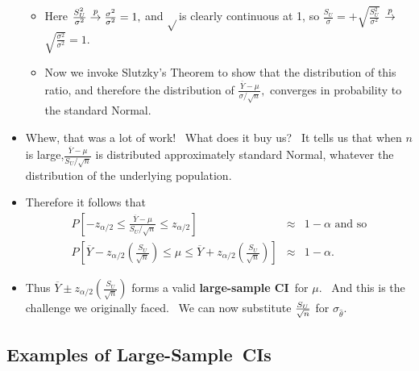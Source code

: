 \documentclass[11pt]{article}
\begin{document}
\begin{itemize}
\begin{itemize}
\item Here $\frac{S_{U}^{2}}{\sigma ^{2}}\overset{p}{\rightarrow }\frac{%
\sigma ^{2}}{\sigma ^{2}}=1,$ and $\sqrt{}$is clearly continuous at 1, so $%
\frac{S_{U}}{\sigma }=+\sqrt{\frac{S_{U}^{2}}{\sigma ^{2}}}$ $\overset{p}{%
\rightarrow }$ $\sqrt{\frac{\sigma ^{2}}{\sigma ^{2}}}=1.$

\item Now we invoke Slutzky's Theorem to show that the distribution of this
ratio, and therefore the distribution of $\frac{\overline{Y}-\mu }{\sigma /%
\sqrt{n}},$ converges in probability to the standard Normal.
\end{itemize}

\item Whew, that was a lot of work! \ What does it buy us? \ It tells us
that when $n$ is large,$\frac{\overline{Y}-\mu }{S_{U}^{{}}/\sqrt{n}}$ is
distributed approximately standard Normal, whatever the distribution of the
underlying population. \ 

\item Therefore it follows that%
\begin{eqnarray*}
P\left[ -z_{\alpha /2}\leq \frac{\overline{Y}-\mu }{S_{U}/\sqrt{n}}\leq
z_{\alpha /2}\right] &\approx &1-\alpha \text{ and so} \\
P\left[ \overline{Y}-z_{\alpha /2}\left( \frac{S_{U}}{\sqrt{n}}\right) \leq
\mu \leq \overline{Y}+z_{\alpha /2}\left( \frac{S_{U}}{\sqrt{n}}\right) %
\right] &\approx &1-\alpha .
\end{eqnarray*}

\item Thus $\overline{Y}\pm z_{\alpha /2}\left( \frac{S_{U}}{\sqrt{n}}%
\right) $ forms a valid \textbf{large-sample CI}\textit{\ }for $\mu .$ \ And
this is the challenge we originally faced. \ We can now substitute $\frac{%
S_{U}}{\sqrt{n}}$ for $\sigma _{\widehat{\theta }}.$
\end{itemize}

\subsection{Examples of Large-Sample\ CIs}
\end{document}
